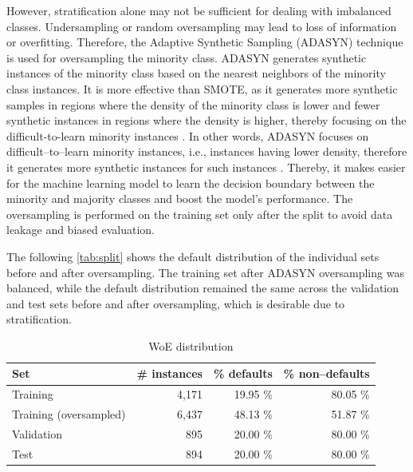 However, stratification alone may not be sufficient for dealing with imbalanced classes.
Undersampling or random oversampling may lead to loss of information or overfitting.
Therefore, the Adaptive Synthetic Sampling (ADASYN) technique is used for oversampling the minority class.
ADASYN generates synthetic instances of the minority class based on the nearest neighbors of the minority class instances.
It is more effective than SMOTE, as it generates more synthetic samples in regions where the density of the minority class is lower and fewer synthetic instances in regions where the density is higher, thereby focusing on the difficult-to-learn minority instances \citep{adasynhaibo}.
In other words, ADASYN focuses on difficult--to--learn minority instances, i.e., instances having lower density, therefore it generates more synthetic instances for such instances \citep{adasynhaibo}.
Thereby, it makes easier for the machine learning model to learn the decision boundary between the minority and majority classes and boost the model's performance. 
The oversampling is performed on the training set only after the split to avoid data leakage and biased evaluation.

The following \autoref{tab:split} shows the default distribution of the individual sets before and after oversampling. The training set after ADASYN oversampling was balanced, while the default distribution remained the same across the validation and test sets before and after oversampling, which is desirable due to stratification.

\begin{table}[H]
    \small
    \setlength{\tabcolsep}{8pt}
    \renewcommand{\arraystretch}{1.3}
    \centering
        \caption[WoE distribution]{WoE distribution}\label{tab:split}
        \begin{tabular}{lrrr}
    \toprule
    \textbf{Set} & \textbf{\# instances} & \textbf{\% defaults} & \textbf{\% non--defaults}\\
    \midrule
    \hline
    Training & 4,171  & 19.95 \% & 80.05 \% \\
    Training (oversampled) & 6,437 &  48.13 \% & 51.87 \% \\

    Validation & 895 &  20.00 \% & 80.00 \% \\

    Test & 894 &  20.00 \% & 80.00 \% \\
    \bottomrule
    \end{tabular}
    \vspace{0.7em}

    \vspace{-1em}
\end{table}

